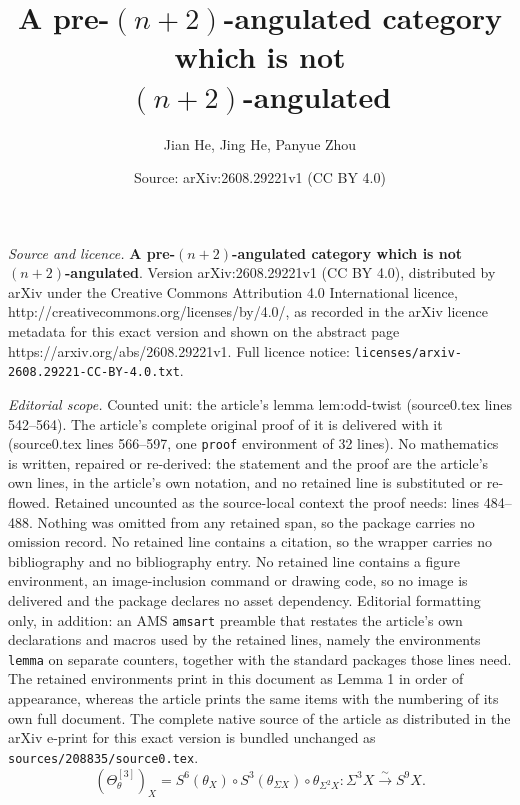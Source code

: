 \documentclass[10pt,a4paper]{amsart}
\title{\Large{\bf A pre-$(n+2)$-angulated category which is not\\[2mm] $(n+2)$-angulated}}
\author{Jian He, Jing He, Panyue Zhou}
\date{Source: arXiv:2608.29221v1 (CC BY 4.0)}
\begin{document}
\maketitle

\noindent\emph{Source and licence.} \Large{\bf A pre-$(n+2)$-angulated category which is not\\[2mm] $(n+2)$-angulated}. Version arXiv:2608.29221v1 (CC BY 4.0), distributed by arXiv under the Creative Commons Attribution 4.0 International licence, http://creativecommons.org/licenses/by/4.0/, as recorded in the arXiv licence metadata for this exact version and shown on the abstract page https://arxiv.org/abs/2608.29221v1. Full licence notice: \texttt{licenses/arxiv-2608.29221-CC-BY-4.0.txt}.\par\smallskip

\noindent\textit{Editorial scope.} Counted unit: the article's lemma lem:odd-twist (source0.tex lines 542--564). The article's complete original proof of it is delivered with it (source0.tex lines 566--597, one \texttt{proof} environment of 32 lines). No mathematics is written, repaired or re-derived: the statement and the proof are the article's own lines, in the article's own notation, and no retained line is substituted or re-flowed.  Retained uncounted as the source-local context the proof needs: lines 484--488.  Nothing was omitted from any retained span, so the package carries no omission record.  No retained line contains a citation, so the wrapper carries no bibliography and no bibliography entry.  No retained line contains a figure environment, an image-inclusion command or drawing code, so no image is delivered and the package declares no asset dependency.  Editorial formatting only, in addition: an AMS \texttt{amsart} preamble that restates the article's own declarations and macros used by the retained lines, namely the environments \texttt{lemma} on separate counters, together with the standard packages those lines need.  The retained environments print in this document as Lemma 1 in order of appearance, whereas the article prints the same items with the numbering of its own full document.  The complete native source of the article as distributed in the arXiv e-print for this exact version is bundled unchanged as \texttt{sources/208835/source0.tex}.
\begin{equation}\label{eq:third-power}
(\Theta_\theta^{[3]})_X
=S^6(\theta_X)\circ S^3(\theta_{\Sigma X})\circ\theta_{\Sigma^2X}\colon
\Sigma^3X\xrightarrow{\sim}S^9X.
\end{equation}
\end{document}

